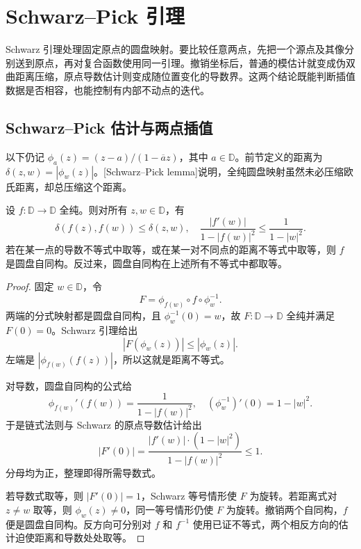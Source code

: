 \section{Schwarz–Pick 引理}
\label{b3:sec:0603}

Schwarz 引理处理固定原点的圆盘映射。要比较任意两点，先把一个源点及其像分别送到原点，再对复合函数使用同一引理。撤销坐标后，普通的模估计就变成伪双曲距离压缩，原点导数估计则变成随位置变化的导数界。这两个结论既能判断插值数据是否相容，也能控制有内部不动点的迭代。

\subsection{Schwarz–Pick 估计与两点插值}
\label{b3:subsec:060301}

以下仍记 \(\phi_a(z)=(z-a)/(1-\overline a z)\)，其中 \(a\in\mathbb D\)。前节定义的距离为 \(\delta(z,w)=|\phi_w(z)|\)。[Schwarz--Pick lemma]说明，全纯圆盘映射虽然未必压缩欧氏距离，却总压缩这个距离。

\begin{theorem}\label{b3:thm:06-schwarz-pick}
设 \(f:\mathbb D\rightarrow\mathbb D\) 全纯。则对所有 \(z,w\in\mathbb D\)，有
\[
 \delta(f(z),f(w))\le\delta(z,w),
 \quad
 \frac{|f'(w)|}{1-|f(w)|^2}\le\frac1{1-|w|^2}.
\]
若在某一点的导数不等式中取等，或在某一对不同点的距离不等式中取等，则 \(f\) 是圆盘自同构。反过来，圆盘自同构在上述所有不等式中都取等。
\end{theorem}
\begin{proof}
固定 \(w\in\mathbb D\)，令
\[
 F=\phi_{f(w)}\circ f\circ\phi_w^{-1}.
\]
两端的分式映射都是圆盘自同构，且 \(\phi_w^{-1}(0)=w\)，故 \(F:\mathbb D\rightarrow\mathbb D\) 全纯并满足 \(F(0)=0\)。Schwarz 引理给出
\[
 |F(\phi_w(z))|\le|\phi_w(z)|.
\]
左端是 \(|\phi_{f(w)}(f(z))|\)，所以这就是距离不等式。

对导数，圆盘自同构的公式给
\[
 \phi_{f(w)}'(f(w))=\frac1{1-|f(w)|^2},
 \quad (\phi_w^{-1})'(0)=1-|w|^2.
\]
于是链式法则与 Schwarz 的原点导数估计给出
\[
 |F'(0)|=
 \frac{|f'(w)|\cdot(1-|w|^2)}{1-|f(w)|^2}\le1.
\]
分母均为正，整理即得所需导数式。

若导数式取等，则 \(|F'(0)|=1\)，Schwarz 等号情形使 \(F\) 为旋转。若距离式对 \(z\ne w\) 取等，则 \(\phi_w(z)\ne0\)，同一等号情形仍使 \(F\) 为旋转。撤销两个自同构，\(f\) 便是圆盘自同构。反方向可分别对 \(f\) 和 \(f^{-1}\) 使用已证不等式，两个相反方向的估计迫使距离和导数处处取等。
\end{proof}

